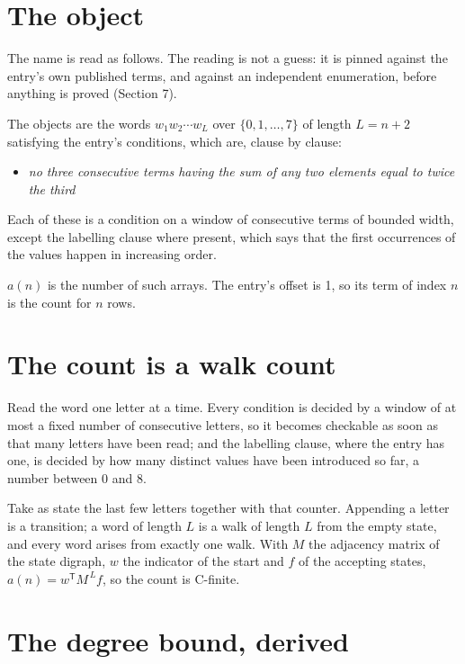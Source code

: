 \documentclass[11pt]{article}
\theoremstyle{definition}
\begin{document}
\section{The object}

The name is read as follows. The reading is not a guess: it is pinned against the entry's own published terms, and against an independent enumeration, before anything is proved (Section 7).

The objects are the words $w_1 w_2 \cdots w_L$ over $\{0,1,\dots,7\}$ of length $L = n + 2$ satisfying the entry's conditions, which are, clause by clause:

\begin{itemize}

\item {\itshape no three consecutive terms having the sum of any two elements equal to twice the third}

\end{itemize}

Each of these is a condition on a window of consecutive terms of bounded width, except the labelling clause where present, which says that the first occurrences of the values happen in increasing order.

$a(n)$ is the number of such arrays. The entry's offset is 1, so its term of index $n$ is the count for $n$ rows.

\section{The count is a walk count}

Read the word one letter at a time. Every condition is decided by a window of at most a fixed number of consecutive letters, so it becomes checkable as soon as that many letters have been read; and the labelling clause, where the entry has one, is decided by how many distinct values have been introduced so far, a number between $0$ and 8.

Take as state the last few letters together with that counter. Appending a letter is a transition; a word of length $L$ is a walk of length $L$ from the empty state, and every word arises from exactly one walk. With $M$ the adjacency matrix of the state digraph, $w$ the indicator of the start and $f$ of the accepting states, $a(n) = w^{\mathsf T}M^{\,L}f$, so the count is C-finite.

\section{The degree bound, derived}
\end{document}
